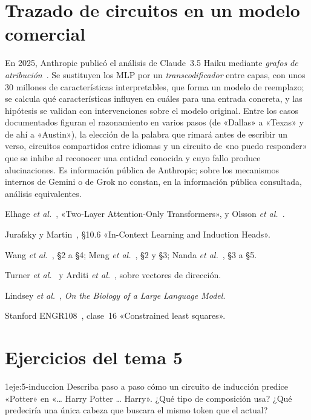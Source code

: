 \section{Trazado de circuitos en un modelo comercial}

En 2025, Anthropic publicó el análisis de Claude~3.5 Haiku mediante \emph{grafos de atribución}~\cite{lindsey}. Se sustituyen los MLP por un \emph{transcodificador} entre capas, con unos 30 millones de características interpretables, que forma un modelo de reemplazo; se calcula qué características influyen en cuáles para una entrada concreta, y las hipótesis se validan con intervenciones sobre el modelo original. Entre los casos documentados figuran el razonamiento en varios pasos (de «Dallas» a «Texas» y de ahí a «Austin»), la elección de la palabra que rimará antes de escribir un verso, circuitos compartidos entre idiomas y un circuito de «no puedo responder» que se inhibe al reconocer una entidad conocida y cuyo fallo produce alucinaciones. Es información pública de Anthropic; sobre los mecanismos internos de Gemini o de Grok no constan, en la información pública consultada, análisis equivalentes.

\begin{lecturas}
\item Elhage \emph{et al.}~\cite{elhage21}, «Two-Layer Attention-Only Transformers», y Olsson \emph{et al.}~\cite{olsson}.
\item Jurafsky y Martin~\cite{jm3}, §10.6 «In-Context Learning and Induction Heads».
\item Wang \emph{et al.}~\cite{wang-ioi}, §2 a §4; Meng \emph{et al.}~\cite{meng}, §2 y §3; Nanda \emph{et al.}~\cite{nanda}, §3 a §5.
\item Turner \emph{et al.}~\cite{turner} y Arditi \emph{et al.}~\cite{arditi}, sobre vectores de dirección.
\item Lindsey \emph{et al.}~\cite{lindsey}, \emph{On the Biology of a Large Language Model}.
\item Stanford ENGR108~\cite{engr108}, clase~16 «Constrained least squares».
\end{lecturas}

\section*{Ejercicios del tema 5}

\begin{ejercicio}{1}{eje:5-induccion}
Describa paso a paso cómo un circuito de inducción predice «Potter» en «\ldots{} Harry Potter \ldots{} Harry». ¿Qué tipo de composición usa? ¿Qué predeciría una única cabeza que buscara el mismo token que el actual?
\end{ejercicio}

